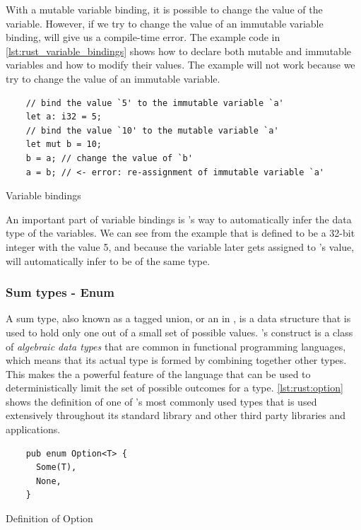 With a mutable variable binding, it is possible to change the value of the variable.
However, if we try to change the value of an immutable variable binding, {\rust} will give us a compile-time error.
The example code in \autoref{lst:rust_variable_bindings} shows how to declare both mutable and immutable variables and how to modify their values.
The example will not work because we try to change the value of an immutable variable.

\begin{listing}[H]
  \begin{verbatim}
    // bind the value `5' to the immutable variable `a'
    let a: i32 = 5;
    // bind the value `10' to the mutable variable `a'
    let mut b = 10;
    b = a; // change the value of `b'
    a = b; // <- error: re-assignment of immutable variable `a'
  \end{verbatim}
  \caption{Variable bindings}
  \label{lst:rust_variable_bindings}
\end{listing}

An important part of variable bindings is {\rust}'s way to automatically infer the data type of the variables.
We can see from the example that  is defined to be a 32-bit integer with the value 5, and because the variable  later gets assigned to 's value, {\rust} will automatically infer  to be of the same type.

\subsubsection{Sum types - Enum}

A sum type, also known as a tagged union, or an {\enum} in {\rust}, is a data structure that is used to hold only one out of a small set of possible values.
\rust's {\enum} construct is a class of \emph{algebraic data types} that are common in functional programming languages, which means that its actual type is formed by combining together other types.
This makes the {\enum} a powerful feature of the language that can be used to deterministically limit the set of possible outcomes for a type.
\autoref{lst:rust:option} shows the definition of one of {\rust}'s most commonly used types that is used extensively throughout its standard library and other third party libraries and applications.

\begin{listing}[H]
  \begin{verbatim}
    pub enum Option<T> {
      Some(T),
      None,
    }
  \end{verbatim}
  \caption{Definition of Option}
  \label{lst:rust:option}
\end{listing}

